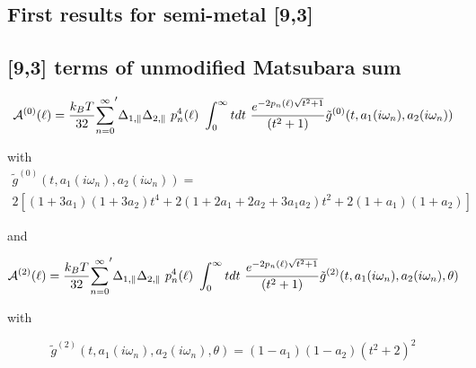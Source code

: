 \documentclass[a4paper]{article}
\begin{document}
\begin{center}
\section{First results for semi-metal [9,3]}
\subsection{[9,3] terms of unmodified Matsubara sum }
\begin{equation}
{\cal A}^{(0)}(\ell) = \frac{k_BT}{32}  {\sum_{n=0}^{\infty}}' \Delta_{1,\parallel} \Delta_{2,\parallel} ~p_n^{4}(\ell) ~\int_0^{\infty} t dt ~\frac{e^{- 2 p_n(\ell) \sqrt{t^{2} + 1}}}{(t^{2} + 1)} \tilde g^{(0)}(t, a_1(i \omega_n), a_2(i \omega_n))
\end{equation}

with
\begin{multline*}
\tilde g^{(0)}(t, a_1(i \omega_n), a_2(i \omega_n)) = \\ 
2 \left[ (1+3a_1)(1+3a_2) t^{4} + 2 (1+2a_1+2a_2+3a_1a_2) t^{2}  + 2(1+a_1)(1+a_2)\right]
\end{multline*}



and

\begin{equation}
{\cal A}^{(2)}(\ell) = \frac{k_BT}{32}  {\sum_{n=0}^{\infty}}' \Delta_{1,\parallel} \Delta_{2,\parallel} ~p_n^{4}(\ell) ~\int_0^{\infty} t dt ~\frac{e^{- 2 p_n(\ell) \sqrt{t^{2} + 1}}}{(t^{2} + 1)} \tilde g^{(2)}(t, a_1(i \omega_n), a_2(i \omega_n), \theta)
\end{equation}

with

\begin{equation}
\tilde g^{(2)}(t, a_1(i \omega_n), a_2(i \omega_n), \theta) = (1-a_1)(1-a_2)(t^{2} + 2)^2
\label{befgqw}
\end{equation}


\end{center}
\end{document}
